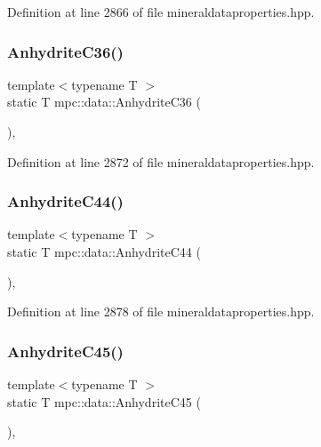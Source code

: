Definition at line 2866 of file mineraldataproperties.\+hpp.

\mbox{\label{namespacempc_1_1data_a5689aef7869c2c2883121c1e838d8fd4}} 
\subsubsection{\texorpdfstring{Anhydrite\+C36()}{AnhydriteC36()}}
{\footnotesize\ttfamily template$<$typename T $>$ \\
static T mpc\+::data\+::\+Anhydrite\+C36 (\begin{DoxyParamCaption}{ }\end{DoxyParamCaption})\hspace{0.3cm}{\ttfamily [inline]}, {\ttfamily [static]}}



Definition at line 2872 of file mineraldataproperties.\+hpp.

\mbox{\label{namespacempc_1_1data_ac9ea2728857d2be154ad5b3f89d03ec8}} 
\subsubsection{\texorpdfstring{Anhydrite\+C44()}{AnhydriteC44()}}
{\footnotesize\ttfamily template$<$typename T $>$ \\
static T mpc\+::data\+::\+Anhydrite\+C44 (\begin{DoxyParamCaption}{ }\end{DoxyParamCaption})\hspace{0.3cm}{\ttfamily [inline]}, {\ttfamily [static]}}



Definition at line 2878 of file mineraldataproperties.\+hpp.

\mbox{\label{namespacempc_1_1data_abf917b564b0504dcd31e3066859037a5}} 
\subsubsection{\texorpdfstring{Anhydrite\+C45()}{AnhydriteC45()}}
{\footnotesize\ttfamily template$<$typename T $>$ \\
static T mpc\+::data\+::\+Anhydrite\+C45 (\begin{DoxyParamCaption}{ }\end{DoxyParamCaption})\hspace{0.3cm}{\ttfamily [inline]}, {\ttfamily [static]}}



